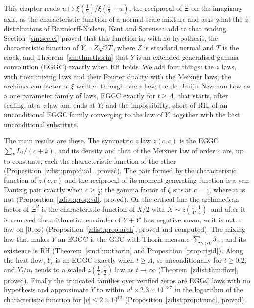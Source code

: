 
This chapter reads $u\mapsto\xi(\frac12)/\xi(\frac12+u)$, the reciprocal of $\Xi$ on the imaginary axis, as the characteristic function of a normal scale mixture and asks what the $z$ distributions of Barndorff-Nielsen, Kent and S{\o}rensen \cite{BNKS82} add to that reading. Section~\ref{sm:sec:cf} proved that this function is, with no hypothesis, the characteristic function of $Y=Z\sqrt{2T}$, where $Z$ is standard normal and $T$ is the clock, and Theorem~\ref{sm:thm:thorin} that $Y$ is an extended generalised gamma convolution (EGGC) exactly when RH holds. We add four things: the $z$ laws, with their mixing laws and their Fourier duality with the Meixner laws; the archimedean factor of $\xi$ written through one $z$ law; the de Bruijn Newman flow as a one parameter family of laws, EGGC exactly for $t\ge\Lambda$, that starts, after scaling, at a $z$ law and ends at $Y$; and the impossibility, short of RH, of an unconditional EGGC family converging to the law of $Y$, together with the best unconditional substitute.

The main results are these. The symmetric $z$ law $z(c,c)$ is the EGGC $\sum_kL_k/(c+k)$, and its density and that of the Meixner law of order $c$ are, up to constants, each the characteristic function of the other (Proposition~\ref{zdist:prop:dual}, proved). The pair formed by the characteristic function of $z(c,c)$ and the reciprocal of its moment generating function is a van Dantzig pair exactly when $c\ge\frac12$; the gamma factor of $\zeta$ sits at $c=\frac14$, where it is not (Proposition~\ref{zdist:prop:vd}, proved). On the critical line the archimedean factor of $\Xi^2$ is the characteristic function of $X/2$ with $X\sim z(\frac14,\frac14)$, and after it is removed the arithmetic remainder of $Y+Y'$ has negative mean, so it is not a law on $[0,\infty)$ (Proposition~\ref{zdist:prop:arch}, proved and computed). The mixing law that makes $Y$ an EGGC is the GGC with Thorin measure $\sum_{\gamma>0}\delta_{\gamma^2}$, and its existence is RH (Theorem~\ref{sm:thm:thorin} and Proposition~\ref{prop:rigid}). Along the heat flow, $Y_t$ is an EGGC exactly when $t\ge\Lambda$, so unconditionally for $t\ge0.2$, and $Y_t/u_t$ tends to a scaled $z(\frac12,\frac12)$ law as $t\to\infty$ (Theorem~\ref{zdist:thm:flow}, proved). Finally the truncated families over verified zeros are EGGC laws with no hypothesis and approximate $Y$ to within $v^4\times2.3\times10^{-37}$ in the logarithm of the characteristic function for $|v|\le2\times10^{12}$ (Proposition~\ref{zdist:prop:trunc}, proved).

